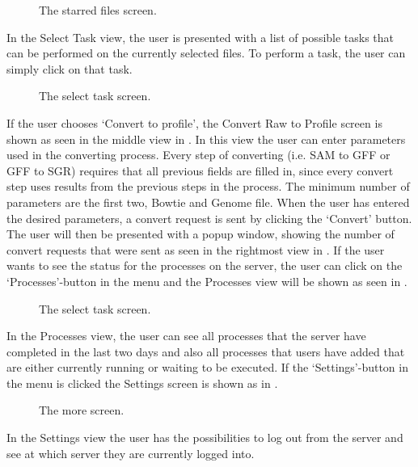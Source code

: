 \begin{figure}[htb]
\caption{The starred files screen.}
\label{fig:ios_selectedFiles}
\end{figure}
\FloatBarrier
In the Select Task view, the user is presented with a list of possible tasks that can be performed on the currently selected files. To perform a task, the user can simply click on that task.

\begin{figure}[htb]
\caption{The select task screen.}
\label{fig:ios_convert}
\end{figure}
\FloatBarrier
If the user chooses ‘Convert to profile’, the Convert Raw to Profile screen is shown as seen in the middle view in . In this view the user can enter parameters used in the converting process. Every step of converting (i.e. SAM to GFF or GFF to SGR) requires that all previous fields are filled in, since every convert step uses results from the previous steps in the process. The minimum number of parameters are the first two, Bowtie and Genome file. When the user has entered the desired parameters, a convert request is sent by clicking the ‘Convert’ button. The user will then be presented with a popup window, showing the number of convert requests that were sent as seen in the rightmost view in . If the user wants to see the status for the processes on the server, the user can click on the ‘Processes’-button in the menu and the Processes view will be shown as seen in .
\begin{figure}[htb]
\caption{The select task screen.}
\label{fig:ios_processes}
\end{figure}
\FloatBarrier
In the Processes view, the user can see all processes that the server have completed in the last two days and also all processes that users have added that are either currently running or waiting to be executed.
If the ‘Settings’-button in the menu is clicked the Settings screen is shown as in .  

\begin{figure}[htb]
\caption{The more screen.}
\label{fig:ios_more}
\end{figure}
\FloatBarrier
In the Settings view the user has the possibilities to log out from the server and see at which server they are currently logged into. 









